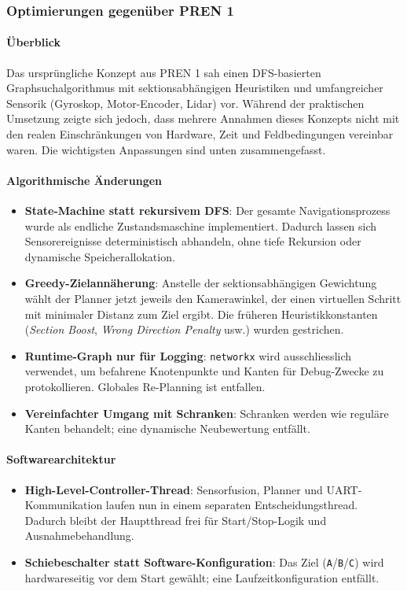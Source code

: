 \documentclass[main.tex]{subfiles} %
\begin{document}
\subsubsection{Optimierungen gegenüber PREN 1}

\paragraph{Überblick}
Das ursprüngliche Konzept aus PREN 1 sah einen DFS-basierten
Graphsuchalgorithmus mit sektionsabhängigen Heuristiken und umfangreicher
Sensorik (Gyroskop, Motor-Encoder, Lidar) vor.
Während der praktischen Umsetzung zeigte sich jedoch, dass mehrere Annahmen
dieses Konzepts nicht mit den realen Einschränkungen von Hardware, Zeit und
Feldbedingungen vereinbar waren.
Die wichtigsten Anpassungen sind unten zusammengefasst.

\paragraph{Algorithmische Änderungen}
\begin{itemize}
  \item \textbf{State-Machine statt rekursivem DFS}:
    Der gesamte Navigationsprozess wurde als endliche Zustandsmaschine
    implementiert.  Dadurch lassen sich Sensorereignisse deterministisch
    abhandeln, ohne tiefe Rekursion oder dynamische Speicherallokation.
  \item \textbf{Greedy-Zielannäherung}:
    Anstelle der sektionsabhängigen Gewichtung
    wählt der Planner jetzt jeweils den Kamerawinkel, der einen virtuellen
    Schritt mit minimaler Distanz zum Ziel ergibt.
    Die früheren Heuristikkonstanten
    (\emph{Section Boost}, \emph{Wrong Direction Penalty} usw.)
    wurden gestrichen.
  \item \textbf{Runtime-Graph nur für Logging}:
    \texttt{networkx} wird ausschliesslich verwendet, um befahrene
    Knotenpunkte und Kanten für Debug-Zwecke zu protokollieren.
    Globales Re-Planning ist entfallen.
  \item \textbf{Vereinfachter Umgang mit Schranken}:
    Schranken werden wie reguläre Kanten behandelt;
    eine dynamische Neubewertung entfällt.
\end{itemize}

\paragraph{Softwarearchitektur}
\begin{itemize}
  \item \textbf{High-Level-Controller-Thread}:
    Sensorfusion, Planner und UART-Kommunikation laufen nun in einem
    separaten Entscheidungsthread.  Dadurch bleibt der Hauptthread frei
    für Start/Stop-Logik und Ausnahmebehandlung.
  \item \textbf{Schiebeschalter statt Software-Konfiguration}:
    Das Ziel (\texttt{A}/\texttt{B}/\texttt{C}) wird hardwareseitig vor
    dem Start gewählt; eine Laufzeitkonfiguration entfällt.
\end{itemize}
\end{document}
